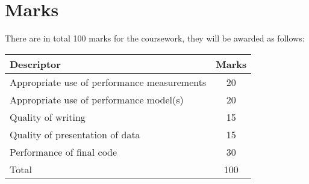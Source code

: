 \documentclass[a4paper]{article}
\begin{document}
\section{Marks}
\label{sec:marks}

There are in total 100 marks for the coursework, they
will be awarded as follows:

\begin{center}
  \renewcommand\tabularxcolumn[1]{m{#1}}
  \begin{tabularx}{0.9\linewidth}{Xc}
    \toprule
    Descriptor                                                  & Marks \\
    \midrule
    Appropriate use of performance measurements                 & 20    \\
    Appropriate use of performance model(s)                     & 20    \\
    Quality of writing                                          & 15    \\
    Quality of presentation of data                             & 15    \\
    \midrule
    Performance of final code                                   & 30    \\
    \midrule
    Total                                                       & 100   \\
    \bottomrule
  \end{tabularx}
\end{center}

\printbibliography
\end{document}
